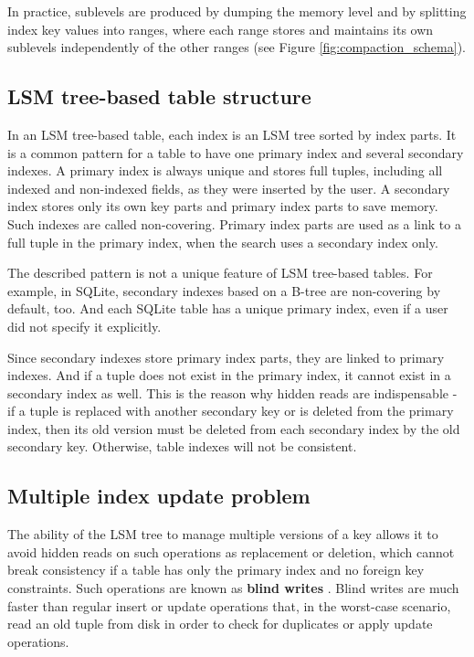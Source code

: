 \documentclass{vldb}
\begin{document}
In practice, sublevels are produced by dumping the memory level and by splitting index
key values into ranges, where each range stores and maintains its own sublevels
independently of the other ranges (see Figure \ref{fig:compaction_schema}).

\subsection{LSM tree-based table structure}
In an LSM tree-based table, each index is an LSM tree sorted by index parts.
It is a common pattern for a table to have one primary index and several
secondary indexes. A primary index is always unique and stores full tuples,
including all indexed and non-indexed fields, as they were inserted by the user.
A secondary index stores only its own key parts and primary index parts to save
memory. Such indexes are called non-covering. Primary index parts are used as a link to
a full tuple in the primary index, when the search uses a secondary index only.

The described pattern is not a unique feature of LSM tree-based tables. For
example, in SQLite, secondary indexes based on a B-tree are non-covering by default,
too. And each SQLite table has a unique primary index, even if a user did not
specify it explicitly.

Since secondary indexes store primary index parts, they are linked to primary
indexes. And if a tuple does not exist in the primary index, it cannot exist in a
secondary index as well. This is the reason why hidden reads are
indispensable - if a tuple is replaced with another secondary key or is deleted
from the primary index, then its old version must be deleted from each secondary
index by the old secondary key. Otherwise, table indexes will not be consistent.

\subsection{Multiple index update problem}
The ability of the LSM tree to manage multiple versions of a key allows it to avoid hidden
reads on such operations as replacement or deletion, which cannot break consistency if
a table has only the primary index and no foreign key constraints. Such operations are known
as \textbf{blind writes} \cite{kai:slimdb}. Blind writes are much faster than regular insert
or update operations that, in the worst-case scenario, read an old tuple from disk in order
to check for duplicates or apply update operations.
\end{document}

